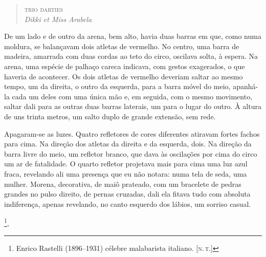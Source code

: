 \begin{verse}
\textsc{trio darties}\\
\emph{Dikki et Miss Arabela}
\end{verse}

De um lado e de outro da arena, bem alto, havia duas barras em que, como
numa moldura, se balançavam dois atletas de vermelho. No centro, uma
barra de madeira, amarrada com duas cordas ao teto do circo, oscilava
solta, à espera. Na arena, uma espécie de palhaço careca indicava, com
gestos exagerados, o que haveria de acontecer. Os dois atletas de
vermelho deveriam saltar ao mesmo tempo, um da direita, o outro da
esquerda, para a barra móvel do meio, apanhá-la cada um deles com uma
única mão e, em seguida, com o mesmo movimento, saltar dali para as
outras duas barras laterais, um para o lugar do outro. À altura de uns
trinta metros, um salto duplo de grande extensão, sem rede.

Apagaram-se as luzes. Quatro refletores de cores diferentes atiravam
fortes fachos para cima. Na direção dos atletas da direita e da
esquerda, dois. Na direção da barra livre do meio, um refletor branco,
que dava às oscilações por cima do circo um ar de fatalidade. O quarto
refletor projetava mais para cima uma luz azul fraca, revelando ali uma
presença que eu não notara: numa tela de seda, uma mulher. Morena,
decorativa, de maiô prateado, com um bracelete de pedras grandes no
pulso direito, de pernas cruzadas, dali ela fitava tudo com absoluta
indiferença, apenas revelando, no canto esquerdo dos lábios, um sorriso
casual.


\footnote{Enrico Rastelli (1896--1931)
  célebre malabarista italiano. {[}\textsc{n.\,t.}{]}}, 

